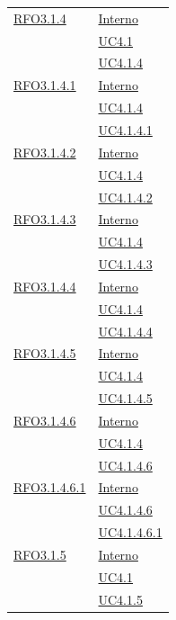\begin{longtable}{|>{\centering}m{5cm}|m{5cm}<{\centering}|}
\hyperlink{RFO3.1.4}{RFO3.1.4} & \hyperlink{Interno}{Interno}\\
& \hyperref[UC4.1]{UC4.1}\\
& \hyperref[UC4.1.4]{UC4.1.4}\\ \hline

\hyperlink{RFO3.1.4.1}{RFO3.1.4.1} & \hyperlink{Interno}{Interno}\\
& \hyperref[UC4.1.4]{UC4.1.4}\\
& \hyperref[UC4.1.4.1]{UC4.1.4.1}\\ \hline

\hyperlink{RFO3.1.4.2}{RFO3.1.4.2} & \hyperlink{Interno}{Interno}\\
& \hyperref[UC4.1.4]{UC4.1.4}\\
& \hyperref[UC4.1.4.2]{UC4.1.4.2}\\ \hline

\hyperlink{RFO3.1.4.3}{RFO3.1.4.3} & \hyperlink{Interno}{Interno}\\
& \hyperref[UC4.1.4]{UC4.1.4}\\
& \hyperref[UC4.1.4.3]{UC4.1.4.3}\\ \hline

\hyperlink{RFO3.1.4.4}{RFO3.1.4.4} & \hyperlink{Interno}{Interno}\\
& \hyperref[UC4.1.4]{UC4.1.4}\\
& \hyperref[UC4.1.4.4]{UC4.1.4.4}\\ \hline

\hyperlink{RFO3.1.4.5}{RFO3.1.4.5} & \hyperlink{Interno}{Interno}\\
& \hyperref[UC4.1.4]{UC4.1.4}\\
& \hyperref[UC4.1.4.5]{UC4.1.4.5}\\ \hline

\hyperlink{RFO3.1.4.6}{RFO3.1.4.6} & \hyperlink{Interno}{Interno}\\
& \hyperref[UC4.1.4]{UC4.1.4}\\
& \hyperref[UC4.1.4.6]{UC4.1.4.6}\\ \hline

\hyperlink{RFO3.1.4.6.1}{RFO3.1.4.6.1} & \hyperlink{Interno}{Interno}\\
& \hyperref[UC4.1.4.6]{UC4.1.4.6}\\
& \hyperref[UC4.1.4.6.1]{UC4.1.4.6.1}\\ \hline

\hyperlink{RFO3.1.5}{RFO3.1.5} & \hyperlink{Interno}{Interno}\\
& \hyperref[UC4.1]{UC4.1}\\
& \hyperref[UC4.1.5]{UC4.1.5}\\ \hline


\end{longtable}
